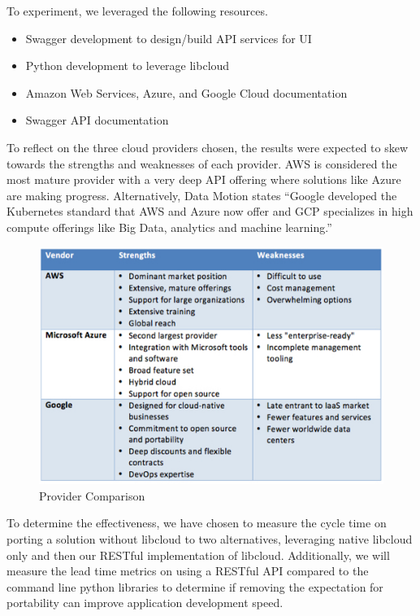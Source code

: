 To experiment, we leveraged the following resources.

\begin{itemize}

\item Swagger development to design/build API services for UI
\item Python development to leverage libcloud
\item Amazon Web Services, Azure, and Google Cloud documentation
\item Swagger API documentation
 
\end{itemize}


To reflect on the three cloud providers chosen, the results were expected to
skew towards the strengths and weaknesses of each provider. AWS is considered
the most mature provider with a very deep API offering where solutions like
Azure are making progress. Alternatively, Data Motion states ``Google developed
the Kubernetes standard that AWS and Azure now offer and GCP specializes in
high compute offerings like Big Data, analytics and machine
learning.''\cite{hid-sp18-518-DataMotion}

\begin{figure}[!ht]
  \centering
  \includegraphics[width=\columnwidth]{images/aws-azure-google.png}
  \caption{Provider Comparison}\label{F:comparison}
\end{figure}

To determine the effectiveness, we have chosen to measure the cycle time on
porting a solution without libcloud to two alternatives, leveraging native
libcloud only and then our RESTful implementation of libcloud. Additionally, we
will measure the lead time metrics on using a RESTful API compared to the
command line python libraries to determine if removing the expectation for
portability can improve application development speed.

